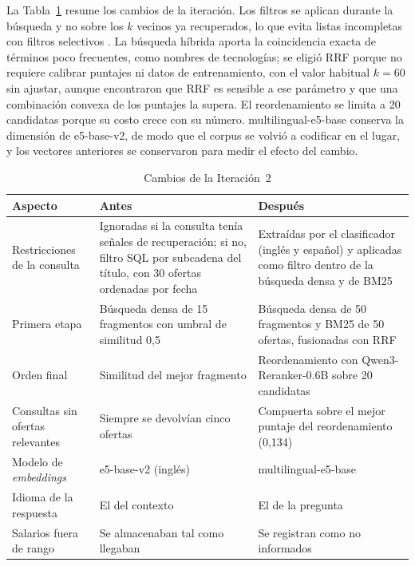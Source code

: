 La Tabla~\ref{tab:art-cambios} resume los cambios de la iteración. Los filtros se aplican durante la búsqueda y no sobre los $k$ vecinos ya recuperados, lo que evita listas incompletas con filtros selectivos \citep{Gollapudi2023, Patel2024}. La búsqueda híbrida aporta la coincidencia exacta de términos poco frecuentes, como nombres de tecnologías; se eligió RRF porque no requiere calibrar puntajes ni datos de entrenamiento, con el valor habitual $k = 60$ sin ajustar, aunque \citet{Bruch2023} encontraron que RRF es sensible a ese parámetro y que una combinación convexa de los puntajes la supera. El reordenamiento se limita a 20 candidatas porque su costo crece con su número. multilingual-e5-base conserva la dimensión de e5-base-v2, de modo que el corpus se volvió a codificar en el lugar, y los vectores anteriores se conservaron para medir el efecto del cambio.

\begin{table}[htbp!]
    \centering
    \caption{Cambios de la Iteración~2}
    \label{tab:art-cambios}
    \small
    \begin{tabular}{|p{3cm}|p{5.4cm}|p{5.4cm}|}
        \hline
        \textbf{Aspecto} & \textbf{Antes} & \textbf{Después} \\
        \hline
        Restricciones de la consulta & Ignoradas si la consulta tenía señales de recuperación; si no, filtro SQL por subcadena del título, con 30 ofertas ordenadas por fecha & Extraídas por el clasificador (inglés y español) y aplicadas como filtro dentro de la búsqueda densa y de BM25 \\
        \hline
        Primera etapa & Búsqueda densa de 15 fragmentos con umbral de similitud 0,5 & Búsqueda densa de 50 fragmentos y BM25 de 50 ofertas, fusionadas con RRF \\
        \hline
        Orden final & Similitud del mejor fragmento & Reordenamiento con Qwen3-Reranker-0.6B sobre 20 candidatas \\
        \hline
        Consultas sin ofertas relevantes & Siempre se devolvían cinco ofertas & Compuerta sobre el mejor puntaje del reordenamiento (0,134) \\
        \hline
        Modelo de \textit{embeddings} & e5-base-v2 (inglés) & multilingual-e5-base \\
        \hline
        Idioma de la respuesta & El del contexto & El de la pregunta \\
        \hline
        Salarios fuera de rango & Se almacenaban tal como llegaban & Se registran como no informados \\
        \hline
    \end{tabular}
\end{table}

